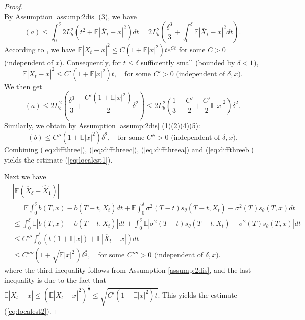 \documentclass[letterpaper,10pt,reqno]{amsart}
\def\eqref#1{(\ref{#1})}
\numberwithin{equation}{section}
\begin{document}
\begin{proof}
\begin{equation}
\end{equation}
By Assumption \ref{assump:2dis} (3), we have
\begin{equation*}
(a) \le \int_0^\delta 2 L_b^2 (t^2 + \mathbb{E}|\overline{X}_t - x|^2) dt
= 2L_b^2 \left(\frac{\delta^3}{3} + \int_0^\delta \mathbb{E}|\overline{X}_t - x|^2 dt \right).
\end{equation*}
According to \cite[Theorem 4.5.4]{KP92},
we have $\mathbb{E}|\overline{X}_t - x|^2 \le C(1 + \mathbb{E}|x|^2)t e^{Ct}$ 
for some $C>0$ (independent of $x$).
Consequently, for $t \le \delta$ sufficiently small (bounded by $\overline{\delta} < 1$),
\begin{equation*}
\mathbb{E}|\overline{X}_t - x|^2 \le C'(1 + \mathbb{E}|x|^2) t, \quad \mbox{for some } C' > 0 \mbox{ (independent of } \delta, x).
\end{equation*}
We then get
\begin{equation}
\label{eq:diffthreea}
(a) \le 2 L_b^2 \left(\frac{\delta^3}{3} + \frac{C'(1 + \mathbb{E}|x|^2)}{2} \delta^2  \right) \le 2 L_b^2 \left(\frac{1}{3} + \frac{C'}{2} + \frac{C'}{2} \mathbb{E}|x|^2 \right) \delta^2.
\end{equation}
Similarly, we obtain by Assumption \ref{assump:2dis} (1)(2)(4)(5):
\begin{equation}
\label{eq:diffthreeb}
(b) \le C'' (1 + \mathbb{E}|x|^2) \delta^2, \quad \mbox{for some } C''>0 \mbox{ (independent of } \delta, x).
\end{equation}
Combining \eqref{eq:diffthree}, \eqref{eq:diffthreec},
\eqref{eq:diffthreea} and \eqref{eq:diffthreeb} yields
the estimate \eqref{eq:localest1}.

Next we have
\begin{align*}
& |\mathbb{E}(\overline{X}_\delta - \widehat{X}_1)|  \\
& = \left|\mathbb{E}\int_0^\delta b(T,x) - b(T-t,\overline{X}_t) dt
+ \mathbb{E}\int_0^\delta \sigma^2(T-t) s_\theta(T-t, \overline{X}_t) - \sigma^2(T)s_\theta(T,x) dt \right| \\
& \le \int_0^\delta \mathbb{E}|b(T,x) - b(T-t,\overline{X}_t)| dt
+ \int_0^\delta \mathbb{E}|\sigma^2(T-t) s_\theta(T-t, \overline{X}_t) - \sigma^2(T)s_\theta(T,x)| dt \\
& \le C''' \int_0^\delta  \left(t (1 + \mathbb{E}|x|) + \mathbb{E}|\overline{X}_t - x| \right) dt \\
& \le C''''(1 + \sqrt{\mathbb{E}|x|^2}) \delta^{\frac{3}{2}},
\quad \mbox{for some } C''''>0 \mbox{ (independent of } \delta, x).
\end{align*}
where the third inequality follows from Assumption \ref{assump:2dis}, and the last inequality is due to the fact that
$\mathbb{E}|\overline{X}_t - x| \le \left(\mathbb{E}|\overline{X}_t - x|^2\right)^{\frac{1}{2}} \le \sqrt{C'(1 + \mathbb{E}|x|^2)t}$.
This yields the estimate \eqref{eq:localest2}.
\end{proof}
\end{document}
